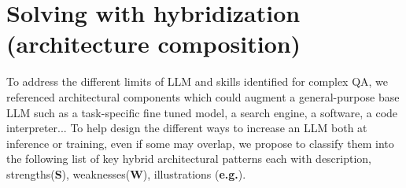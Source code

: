 \documentclass[acmsmall]{acmart}
\begin{document}
\section{Solving with hybridization (architecture composition)}\label{sec_hybridLLMpatterns}\label{sec_architectural_patterns}

To address the different limits of LLM and skills identified for complex QA, we referenced architectural components which could augment a general-purpose base LLM such as a task-specific fine tuned model, a search engine, a software, a code interpreter... To help design the different ways to increase an LLM both at inference or training, even if some may overlap, we propose to classify them into the following list of key hybrid architectural patterns each with description, strengths(\textbf{S}), weaknesses(\textbf{W}), illustrations (\textbf{e.g.}).

\titleformat{\subsection}[runin]{\normalfont\small\bfseries}{}{0em}{}
\titlespacing{\subsection}{0pt}{-\parskip}{-\parskip}
\end{document}
